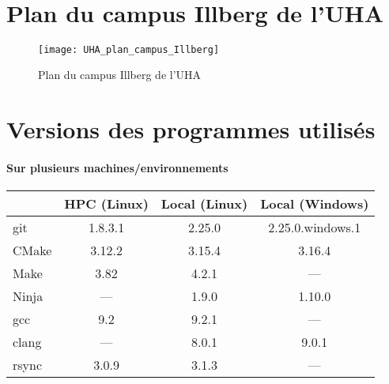\documentclass[a4paper,11pt,twoside,french,report]{../common/simplem}
\begin{document}
			\paragraph*{}
				
				\hfill\\
			\paragraph*{}
				
				\hfill\\
			\paragraph*{}
				
				\hfill\\
		\newpage\section{Plan du campus Illberg de l'\acrshort{UHA}}\label{sec:uha_illberg_map}
			\begin{figure}[H]
				\centering%
				\texttt{[image: UHA\_plan\_campus\_Illberg]}%
				\caption{Plan du campus Illberg de l'\acrshort{UHA}~\cite{UHA_Plan_acces}}%
				\label{fig:UHA_plan_campus_Illberg}%
			\end{figure}
		\newpage\section{Versions des programmes utilisés}\label{sec:programs_versions}
			\paragraph*{Sur plusieurs machines/environnements}
				\begin{center}
					\begin{tabular}{lccc}
						& HPC (Linux) & Local (Linux) & Local (Windows)\\
						\midrule
						git & 1.8.3.1 & 2.25.0 & 2.25.0.windows.1\\
						CMake & 3.12.2 & 3.15.4 & 3.16.4\\
						Make & 3.82 & 4.2.1 & ---\\
						Ninja & --- & 1.9.0 & 1.10.0\\
						gcc & 9.2 & 9.2.1 & ---\\
						clang & --- & 8.0.1 & 9.0.1\\
						rsync & 3.0.9 & 3.1.3 & ---\\
					\end{tabular}
				\end{center}
\end{document}

